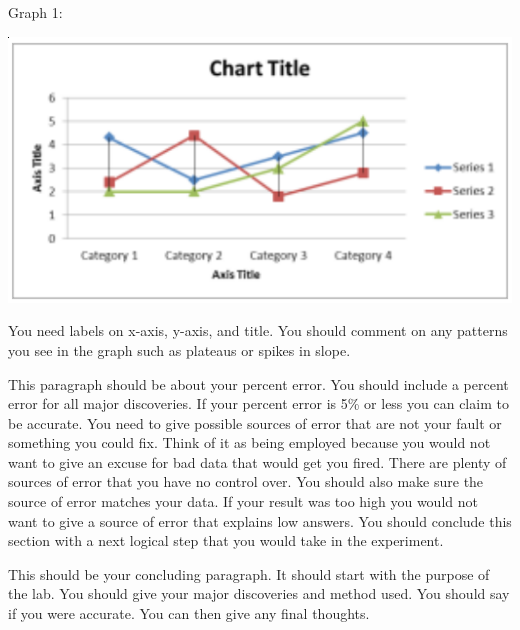 \documentclass{report}
\begin{document}
\begin{flushleft}
Graph 1: 
\end{flushleft}
\begin{center}
\includegraphics[scale=.7]{graph}
\end{center}
\begin{flushleft}
You need labels on x-axis, y-axis, and title. You should comment on any patterns you see in the graph such as plateaus or spikes in slope.
\end{flushleft}
\indent This paragraph should be about your percent error. You should include a percent error for all major discoveries. If your percent error is 5\% or less you can claim to be accurate. You need to give possible sources of error that are not your fault or something you could fix. Think of it as being employed because you would not want to give an excuse for bad data that would get you fired. There are plenty of sources of error that you have no control over. You should also make sure the source of error matches your data. If your result was too high you would not want to give a source of error that explains low answers.  You should conclude this section with a next logical step that you would take in the experiment.
\begin{flushleft}
	This should be your concluding paragraph. It should start with the purpose of the lab. You should give your major discoveries and method used. You should say if you were accurate. You can then give any final thoughts.
\end{flushleft}
\printbibliography
\end{document}
